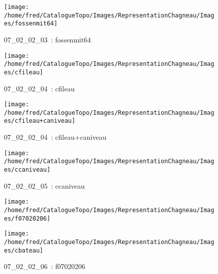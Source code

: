 \documentclass[12pt,titlepage]{book}
\begin{document}
\begin{figure}[h!]
\begin{minipage}[t]{3cm}
    \begin{center}
      \texttt{[image: /home/fred/CatalogueTopo/Images/RepresentationChagneau/Images/fossenmit64]}
      \caption[~07\_02\_02\_03]{\small{07\_02\_02\_03~:} \tiny{fossenmit64}}\label{fossenmit64}
    \end{center}
  \end{minipage}
  \begin{minipage}[t]{3cm}
    \begin{center}
      \texttt{[image: /home/fred/CatalogueTopo/Images/RepresentationChagneau/Images/cfileau]}
      \caption[~07\_02\_02\_04]{\small{07\_02\_02\_04~:} \tiny{cfileau}}\label{cfileau}
    \end{center}
  \end{minipage}
  \begin{minipage}[t]{3cm}
    \begin{center}
      \texttt{[image: /home/fred/CatalogueTopo/Images/RepresentationChagneau/Images/cfileau+caniveau]}
      \caption[~07\_02\_02\_04]{\small{07\_02\_02\_04~:} \tiny{cfileau+caniveau}}\label{cfileau+caniveau}
    \end{center}
  \end{minipage}
  \begin{minipage}[t]{3cm}
    \begin{center}
      \texttt{[image: /home/fred/CatalogueTopo/Images/RepresentationChagneau/Images/ccaniveau]}
      \caption[~07\_02\_02\_05]{\small{07\_02\_02\_05~:} \tiny{ccaniveau}}\label{ccaniveau}
    \end{center}
  \end{minipage}
  \begin{minipage}[t]{3cm}
    \begin{center}
      \texttt{[image: /home/fred/CatalogueTopo/Images/RepresentationChagneau/Images/f07020206]}
      \caption[~07\_02\_02\_06]{\small{07\_02\_02\_06~:} \tiny{f07020206}}\label{f07020206}
    \end{center}
  \end{minipage}
  \begin{minipage}[t]{3cm}
    \begin{center}
      \texttt{[image: /home/fred/CatalogueTopo/Images/RepresentationChagneau/Images/cbateau]}

\end{center}
\end{minipage}
\end{figure}
\end{document}
